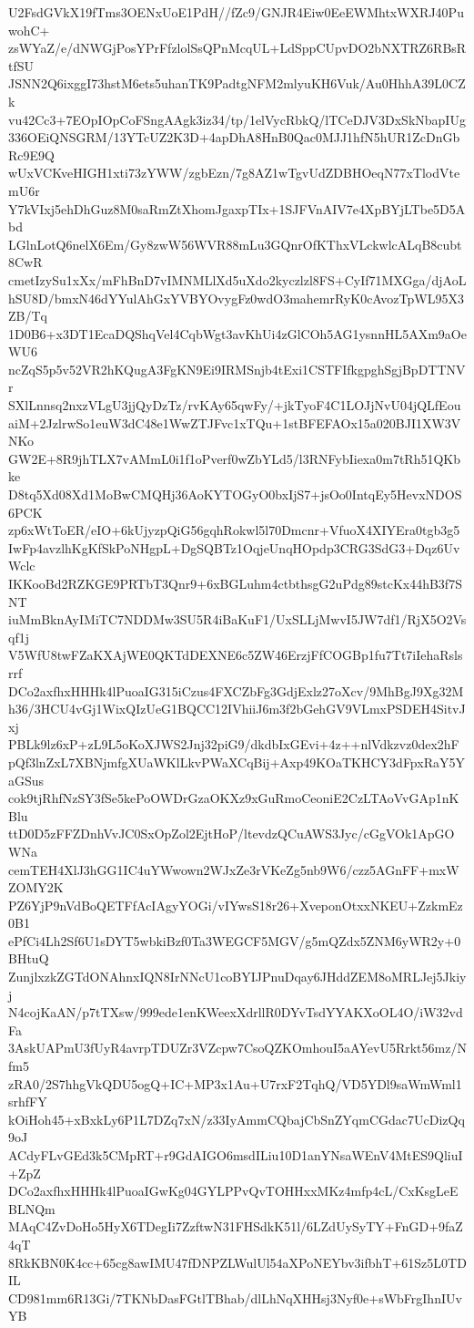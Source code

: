 U2FsdGVkX19fTms3OENxUoE1PdH//fZc9/GNJR4Eiw0EeEWMhtxWXRJ40PuwohC+
zsWYaZ/e/dNWGjPosYPrFfzlolSsQPnMcqUL+LdSppCUpvDO2bNXTRZ6RBsRtfSU
JSNN2Q6ixggI73hstM6ets5uhanTK9PadtgNFM2mlyuKH6Vuk/Au0HhhA39L0CZk
vu42Cc3+7EOpIOpCoFSngAAgk3iz34/tp/1elVycRbkQ/lTCeDJV3DxSkNbapIUg
336OEiQNSGRM/13YTcUZ2K3D+4apDhA8HnB0Qac0MJJ1hfN5hUR1ZcDnGbRc9E9Q
wUxVCKveHIGH1xti73zYWW/zgbEzn/7g8AZ1wTgvUdZDBHOeqN77xTlodVtemU6r
Y7kVIxj5ehDhGuz8M0saRmZtXhomJgaxpTIx+1SJFVnAIV7e4XpBYjLTbe5D5Abd
LGlnLotQ6nelX6Em/Gy8zwW56WVR88mLu3GQnrOfKThxVLckwlcALqB8cubt8CwR
cmetIzySu1xXx/mFhBnD7vIMNMLlXd5uXdo2kyczlzl8FS+CyIf71MXGga/djAoL
hSU8D/bmxN46dYYulAhGxYVBYOvygFz0wdO3mahemrRyK0cAvozTpWL95X3ZB/Tq
1D0B6+x3DT1EcaDQShqVel4CqbWgt3avKhUi4zGlCOh5AG1ysnnHL5AXm9aOeWU6
ncZqS5p5v52VR2hKQugA3FgKN9Ei9IRMSnjb4tExi1CSTFIfkgpghSgjBpDTTNVr
SXlLnnsq2nxzVLgU3jjQyDzTz/rvKAy65qwFy/+jkTyoF4C1LOJjNvU04jQLfEou
aiM+2JzlrwSo1euW3dC48e1WwZTJFvc1xTQu+1stBFEFAOx15a020BJI1XW3VNKo
GW2E+8R9jhTLX7vAMmL0i1f1oPverf0wZbYLd5/l3RNFybIiexa0m7tRh51QKbke
D8tq5Xd08Xd1MoBwCMQHj36AoKYTOGyO0bxIjS7+jsOo0IntqEy5HevxNDOS6PCK
zp6xWtToER/eIO+6kUjyzpQiG56gqhRokwl5l70Dmcnr+VfuoX4XIYEra0tgb3g5
IwFp4avzlhKgKfSkPoNHgpL+DgSQBTz1OqjeUnqHOpdp3CRG3SdG3+Dqz6UvWclc
IKKooBd2RZKGE9PRTbT3Qnr9+6xBGLuhm4ctbthsgG2uPdg89stcKx44hB3f7SNT
iuMmBknAyIMiTC7NDDMw3SU5R4iBaKuF1/UxSLLjMwvI5JW7df1/RjX5O2Vsqf1j
V5WfU8twFZaKXAjWE0QKTdDEXNE6c5ZW46ErzjFfCOGBp1fu7Tt7iIehaRslsrrf
DCo2axfhxHHHk4lPuoaIG315iCzus4FXCZbFg3GdjExlz27oXcv/9MhBgJ9Xg32M
h36/3HCU4vGj1WixQIzUeG1BQCC12IVhiiJ6m3f2bGehGV9VLmxPSDEH4SitvJxj
PBLk9lz6xP+zL9L5oKoXJWS2Jnj32piG9/dkdbIxGEvi+4z++nlVdkzvz0dex2hF
pQf3lnZxL7XBNjmfgXUaWKlLkvPWaXCqBij+Axp49KOaTKHCY3dFpxRaY5YaGSus
cok9tjRhfNzSY3fSe5kePoOWDrGzaOKXz9xGuRmoCeoniE2CzLTAoVvGAp1nKBlu
ttD0D5zFFZDnhVvJC0SxOpZol2EjtHoP/ltevdzQCuAWS3Jyc/cGgVOk1ApGOWNa
cemTEH4XlJ3hGG1IC4uYWwown2WJxZe3rVKeZg5nb9W6/czz5AGnFF+mxWZOMY2K
PZ6YjP9nVdBoQETFfAcIAgyYOGi/vIYwsS18r26+XveponOtxxNKEU+ZzkmEz0B1
ePfCi4Lh2Sf6U1sDYT5wbkiBzf0Ta3WEGCF5MGV/g5mQZdx5ZNM6yWR2y+0BHtuQ
ZunjlxzkZGTdONAhnxIQN8IrNNcU1coBYIJPnuDqay6JHddZEM8oMRLJej5Jkiyj
N4cojKaAN/p7tTXsw/999ede1enKWeexXdrllR0DYvTsdYYAKXoOL4O/iW32vdFa
3AskUAPmU3fUyR4avrpTDUZr3VZcpw7CsoQZKOmhouI5aAYevU5Rrkt56mz/Nfm5
zRA0/2S7hhgVkQDU5ogQ+IC+MP3x1Au+U7rxF2TqhQ/VD5YDl9saWmWml1srhfFY
kOiHoh45+xBxkLy6P1L7DZq7xN/z33IyAmmCQbajCbSnZYqmCGdac7UcDizQq9oJ
ACdyFLvGEd3k5CMpRT+r9GdAIGO6msdILiu10D1anYNsaWEnV4MtES9QliuI+ZpZ
DCo2axfhxHHHk4lPuoaIGwKg04GYLPPvQvTOHHxxMKz4mfp4cL/CxKsgLeEBLNQm
MAqC4ZvDoHo5HyX6TDegIi7ZzftwN31FHSdkK51l/6LZdUySyTY+FnGD+9faZ4qT
8RkKBN0K4cc+65cg8awIMU47fDNPZLWulUl54aXPoNEYbv3ifbhT+61Sz5L0TDIL
CD981mm6R13Gi/7TKNbDasFGtlTBhab/dlLhNqXHHsj3Nyf0e+sWbFrgIhnIUvYB
